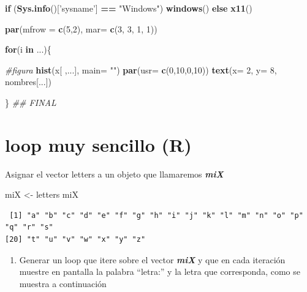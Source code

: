 \documentclass[]{book}
\newenvironment{Shaded}{\begin{snugshade}}{\end{snugshade}}
\newcommand{\CommentTok}[1]{\textcolor[rgb]{0.56,0.35,0.01}{\textit{#1}}}
\newcommand{\ControlFlowTok}[1]{\textcolor[rgb]{0.13,0.29,0.53}{\textbf{#1}}}
\newcommand{\DataTypeTok}[1]{\textcolor[rgb]{0.13,0.29,0.53}{#1}}
\newcommand{\DecValTok}[1]{\textcolor[rgb]{0.00,0.00,0.81}{#1}}
\newcommand{\KeywordTok}[1]{\textcolor[rgb]{0.13,0.29,0.53}{\textbf{#1}}}
\newcommand{\NormalTok}[1]{#1}
\newcommand{\OperatorTok}[1]{\textcolor[rgb]{0.81,0.36,0.00}{\textbf{#1}}}
\newcommand{\StringTok}[1]{\textcolor[rgb]{0.31,0.60,0.02}{#1}}
\providecommand{\tightlist}{%
  \setlength{\itemsep}{0pt}\setlength{\parskip}{0pt}}
\begin{document}
\begin{Shaded}
\begin{Highlighting}[]
\ControlFlowTok{if}\NormalTok{ (}\KeywordTok{Sys.info}\NormalTok{()[}\StringTok{'sysname'}\NormalTok{] }\OperatorTok{==}\StringTok{ "Windows"}\NormalTok{) }\KeywordTok{windows}\NormalTok{() }\ControlFlowTok{else} \KeywordTok{x11}\NormalTok{() }

\KeywordTok{par}\NormalTok{(}\DataTypeTok{mfrow =} \KeywordTok{c}\NormalTok{(}\DecValTok{5}\NormalTok{,}\DecValTok{2}\NormalTok{), }\DataTypeTok{mar=} \KeywordTok{c}\NormalTok{(}\DecValTok{3}\NormalTok{, }\DecValTok{3}\NormalTok{, }\DecValTok{1}\NormalTok{, }\DecValTok{1}\NormalTok{))}

\ControlFlowTok{for}\NormalTok{(i }\ControlFlowTok{in}\NormalTok{ ...)\{}

\CommentTok{#figura}
\KeywordTok{hist}\NormalTok{(x[ ,...], }\DataTypeTok{main=} \StringTok{""}\NormalTok{)}
\KeywordTok{par}\NormalTok{(}\DataTypeTok{usr=} \KeywordTok{c}\NormalTok{(}\DecValTok{0}\NormalTok{,}\DecValTok{10}\NormalTok{,}\DecValTok{0}\NormalTok{,}\DecValTok{10}\NormalTok{))}
\KeywordTok{text}\NormalTok{(}\DataTypeTok{x=} \DecValTok{2}\NormalTok{, }\DataTypeTok{y=} \DecValTok{8}\NormalTok{, nombres[...])}

\NormalTok{\} }\CommentTok{## FINAL}
\end{Highlighting}
\end{Shaded}

\hypertarget{loop-muy-sencillo-r}{%
\section{loop muy sencillo (R)}\label{loop-muy-sencillo-r}}

Asignar el vector letters a un objeto que llamaremos \textbf{\emph{miX}}

\begin{Shaded}
\begin{Highlighting}[]
\NormalTok{miX <-}\StringTok{ }\NormalTok{letters }
\NormalTok{miX}
\end{Highlighting}
\end{Shaded}

\begin{verbatim}
 [1] "a" "b" "c" "d" "e" "f" "g" "h" "i" "j" "k" "l" "m" "n" "o" "p" "q" "r" "s"
[20] "t" "u" "v" "w" "x" "y" "z"
\end{verbatim}

\begin{enumerate}
\def\labelenumi{\alph{enumi})}
\tightlist
\item
  Generar un loop que itere sobre el vector \textbf{\emph{miX}} y que en cada iteración muestre en pantalla la palabra ``letra:'' y la letra que corresponda, como se muestra a continuación
\end{enumerate}
\end{document}
